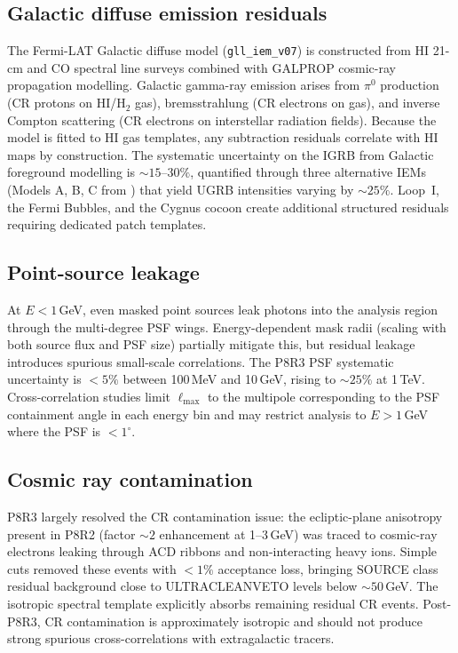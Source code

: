 \documentclass[10pt,a4paper]{article}
\begin{document}
\subsection{Galactic diffuse emission residuals}

The Fermi-LAT Galactic diffuse model (\texttt{gll\_iem\_v07}) is constructed from HI 21-cm and CO spectral line surveys combined with GALPROP cosmic-ray propagation modelling. Galactic gamma-ray emission arises from $\pi^0$ production (CR protons on HI/H$_2$ gas), bremsstrahlung (CR electrons on gas), and inverse Compton scattering (CR electrons on interstellar radiation fields). Because the model is fitted to HI gas templates, any subtraction residuals correlate with HI maps by construction. The systematic uncertainty on the IGRB from Galactic foreground modelling is $\sim15$--$30\%$, quantified through three alternative IEMs (Models A, B, C from \citealt{Ackermann2015}) that yield UGRB intensities varying by $\sim25\%$. Loop~I, the Fermi Bubbles, and the Cygnus cocoon create additional structured residuals requiring dedicated patch templates.

\subsection{Point-source leakage}

At $E < 1$\,GeV, even masked point sources leak photons into the analysis region through the multi-degree PSF wings. Energy-dependent mask radii (scaling with both source flux and PSF size) partially mitigate this, but residual leakage introduces spurious small-scale correlations. The P8R3 PSF systematic uncertainty is $<5\%$ between 100\,MeV and 10\,GeV, rising to $\sim25\%$ at 1\,TeV. Cross-correlation studies limit $\ell_{\max}$ to the multipole corresponding to the PSF containment angle in each energy bin and may restrict analysis to $E > 1$\,GeV where the PSF is $< 1^\circ$.

\subsection{Cosmic ray contamination}

P8R3 largely resolved the CR contamination issue: the ecliptic-plane anisotropy present in P8R2 (factor $\sim2$ enhancement at 1--3\,GeV) was traced to cosmic-ray electrons leaking through ACD ribbons and non-interacting heavy ions. Simple cuts removed these events with $<1\%$ acceptance loss, bringing SOURCE class residual background close to ULTRACLEANVETO levels below $\sim50$\,GeV. The isotropic spectral template explicitly absorbs remaining residual CR events. Post-P8R3, CR contamination is approximately isotropic and should not produce strong spurious cross-correlations with extragalactic tracers.
\end{document}
